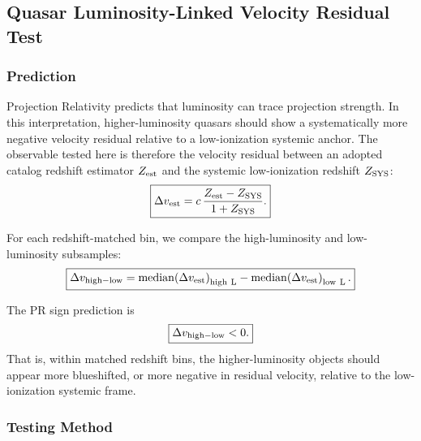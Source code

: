 \documentclass[11pt]{article}
\begin{document}
\subsection{Quasar Luminosity-Linked Velocity Residual Test}
\label{sec:quasar_luminosity_residual_test}

\subsubsection{Prediction}

Projection Relativity predicts that luminosity can trace projection strength. In this interpretation, higher-luminosity quasars should show a systematically more negative velocity residual relative to a low-ionization systemic anchor. The observable tested here is therefore the velocity residual between an adopted catalog redshift estimator \(Z_{\rm est}\) and the systemic low-ionization redshift \(Z_{\rm SYS}\):
\begin{equation}
\boxed{
\Delta v_{\rm est}
=
c\,
\frac{Z_{\rm est}-Z_{\rm SYS}}{1+Z_{\rm SYS}} .
}
\label{eq:quasar_velocity_residual}
\end{equation}

For each redshift-matched bin, we compare the high-luminosity and low-luminosity subsamples:
\begin{equation}
\boxed{
\Delta v_{\rm high-low}
=
{\rm median}\!\left(\Delta v_{\rm est}\right)_{\rm high\ L}
-
{\rm median}\!\left(\Delta v_{\rm est}\right)_{\rm low\ L}.
}
\label{eq:quasar_high_low_residual}
\end{equation}

The PR sign prediction is
\begin{equation}
\boxed{
\Delta v_{\rm high-low}<0.
}
\label{eq:quasar_pr_sign_prediction}
\end{equation}
That is, within matched redshift bins, the higher-luminosity objects should appear more blueshifted, or more negative in residual velocity, relative to the low-ionization systemic frame.

\subsubsection{Testing Method}
\label{sec:quasar_testing_method}
\end{document}
